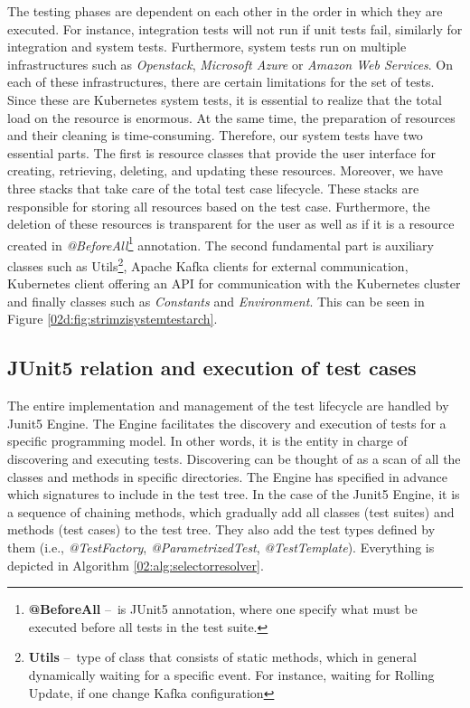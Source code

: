 The testing phases are dependent on each other in the order in which they are executed. For instance, integration tests will not run if unit tests fail, similarly for integration and system tests. Furthermore, system tests run on multiple infrastructures such as \emph{Openstack}, \emph{Microsoft Azure} or \emph{Amazon Web Services}. On each of these infrastructures, there are certain limitations for the set of tests. Since these are Kubernetes system tests, it is essential to realize that the total load on the resource is enormous. At the same time, the preparation of resources and their cleaning is time-consuming. Therefore, our system tests have two essential parts. The first is resource classes that provide the user interface for creating, retrieving, deleting, and updating these resources.
Moreover, we have three stacks that take care of the total test case lifecycle. These stacks are responsible for storing all resources based on the test case. Furthermore, the deletion of these resources is transparent for the user as well as if it is a resource created in \emph{@BeforeAll}\footnote{\textbf{@BeforeAll } \---\ is JUnit5 annotation, where one specify what must be executed before all tests in the test suite.} annotation. The second fundamental part is auxiliary classes such as Utils\footnote {\textbf{Utils} \---\ type of class that consists of static methods, which in general dynamically waiting for a specific event. For instance, waiting for Rolling Update, if one change Kafka configuration}, Apache Kafka clients for external communication, Kubernetes client offering an API for communication with the Kubernetes cluster and finally classes such as \emph{Constants} and \emph{Environment}. This can be seen in Figure \ref{02d:fig:strimzisystemtestarch}.

\subsection{JUnit5 relation and execution of test cases}
\label{02:subsec:strimziJunit5relation:execution}

The entire implementation and management of the test lifecycle are handled by Junit5 Engine. The Engine facilitates the discovery and execution of tests for a specific programming model. In other words, it is the entity in charge of discovering and executing tests. Discovering can be thought of as a scan of all the classes and methods in specific directories. The Engine has specified in advance which signatures to include in the test tree. In the case of the Junit5 Engine, it is a sequence of chaining methods, which gradually add all classes (test suites) and methods (test cases) to the test tree. They also add the test types defined by them (i.e., \emph{@TestFactory}, \emph{@ParametrizedTest}, \emph{@TestTemplate}). Everything is depicted in Algorithm \ref{02:alg:selectorresolver}. 

